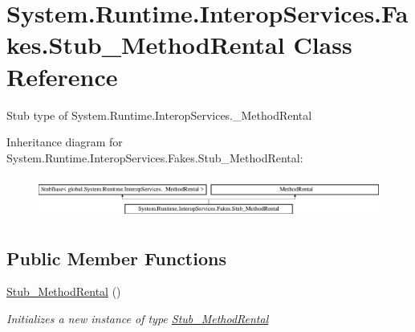 \hypertarget{class_system_1_1_runtime_1_1_interop_services_1_1_fakes_1_1_stub___method_rental}{\section{System.\-Runtime.\-Interop\-Services.\-Fakes.\-Stub\-\_\-\-Method\-Rental Class Reference}
\label{class_system_1_1_runtime_1_1_interop_services_1_1_fakes_1_1_stub___method_rental}
}


Stub type of System.\-Runtime.\-Interop\-Services.\-\_\-\-Method\-Rental 


Inheritance diagram for System.\-Runtime.\-Interop\-Services.\-Fakes.\-Stub\-\_\-\-Method\-Rental\-:\begin{figure}[H]
\begin{center}
\leavevmode
\includegraphics[height=1.386139cm]{class_system_1_1_runtime_1_1_interop_services_1_1_fakes_1_1_stub___method_rental}
\end{center}
\end{figure}
\subsection*{Public Member Functions}
\begin{DoxyCompactItemize}
\item 
\hyperlink{class_system_1_1_runtime_1_1_interop_services_1_1_fakes_1_1_stub___method_rental_ab0acfea1906896e0e83f0c4b8b22eb71}{Stub\-\_\-\-Method\-Rental} ()
\begin{DoxyCompactList}\small\item\em Initializes a new instance of type \hyperlink{class_system_1_1_runtime_1_1_interop_services_1_1_fakes_1_1_stub___method_rental}{Stub\-\_\-\-Method\-Rental}\end{DoxyCompactList}\end{DoxyCompactItemize}
